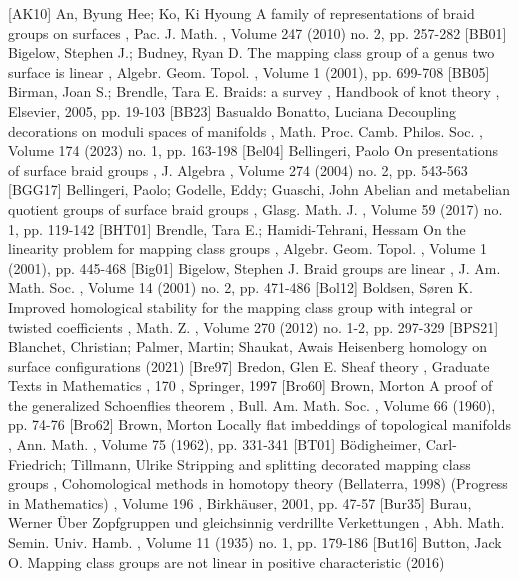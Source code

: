  [AK10] An, Byung Hee; Ko, Ki Hyoung A family of representations of braid groups on surfaces , Pac. J. Math. , Volume 247 (2010) no. 2, pp. 257-282
 [BB01] Bigelow, Stephen J.; Budney, Ryan D. The mapping class group of a genus two surface is linear , Algebr. Geom. Topol. , Volume 1 (2001), pp. 699-708
 [BB05] Birman, Joan S.; Brendle, Tara E. Braids: a survey , Handbook of knot theory , Elsevier, 2005, pp. 19-103
 [BB23] Basualdo Bonatto, Luciana Decoupling decorations on moduli spaces of manifolds , Math. Proc. Camb. Philos. Soc. , Volume 174 (2023) no. 1, pp. 163-198
 [Bel04] Bellingeri, Paolo On presentations of surface braid groups , J. Algebra , Volume 274 (2004) no. 2, pp. 543-563
 [BGG17] Bellingeri, Paolo; Godelle, Eddy; Guaschi, John Abelian and metabelian quotient groups of surface braid groups , Glasg. Math. J. , Volume 59 (2017) no. 1, pp. 119-142
 [BHT01] Brendle, Tara E.; Hamidi-Tehrani, Hessam On the linearity problem for mapping class groups , Algebr. Geom. Topol. , Volume 1 (2001), pp. 445-468
 [Big01] Bigelow, Stephen J. Braid groups are linear , J. Am. Math. Soc. , Volume 14 (2001) no. 2, pp. 471-486
 [Bol12] Boldsen, Søren K. Improved homological stability for the mapping class group with integral or twisted coefficients , Math. Z. , Volume 270 (2012) no. 1-2, pp. 297-329
 [BPS21] Blanchet, Christian; Palmer, Martin; Shaukat, Awais Heisenberg homology on surface configurations (2021)
 [Bre97] Bredon, Glen E. Sheaf theory , Graduate Texts in Mathematics , 170 , Springer, 1997
 [Bro60] Brown, Morton A proof of the generalized Schoenflies theorem , Bull. Am. Math. Soc. , Volume 66 (1960), pp. 74-76
 [Bro62] Brown, Morton Locally flat imbeddings of topological manifolds , Ann. Math. , Volume 75 (1962), pp. 331-341
 [BT01] Bödigheimer, Carl-Friedrich; Tillmann, Ulrike Stripping and splitting decorated mapping class groups , Cohomological methods in homotopy theory (Bellaterra, 1998) (Progress in Mathematics) , Volume 196 , Birkhäuser, 2001, pp. 47-57
 [Bur35] Burau, Werner Über Zopfgruppen und gleichsinnig verdrillte Verkettungen , Abh. Math. Semin. Univ. Hamb. , Volume 11 (1935) no. 1, pp. 179-186
 [But16] Button, Jack O. Mapping class groups are not linear in positive characteristic (2016)
